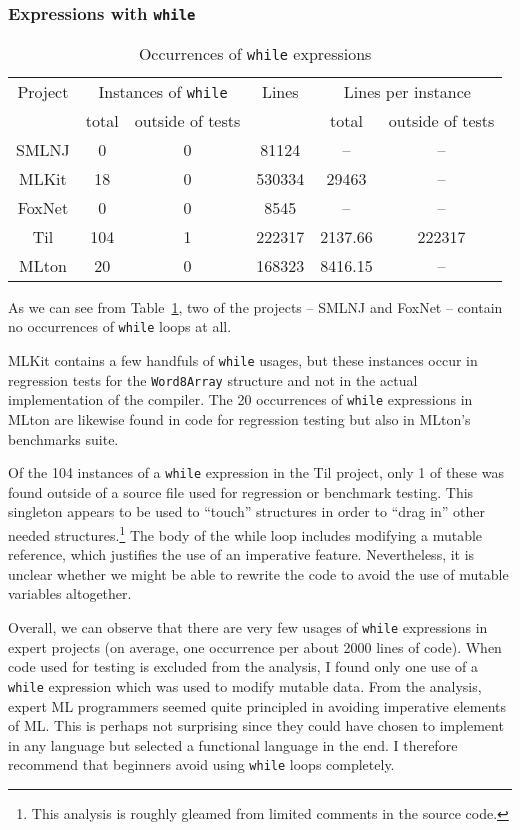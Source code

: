 \documentclass[12pt,abstracton]{scrartcl}
\begin{document}
\subsubsection{Expressions with \texttt{while}}
\begin{table}[h!]
\centering
\begin{tabular}{|c||c|c||c|c|c|}
\hline
Project & \multicolumn{2}{c||}{Instances of \texttt{while}} & Lines & \multicolumn{2}{c|}{Lines per instance} \\ \cline{2-3}\cline{5-6}
 & total & outside of tests &  & total & outside of tests \\ \hline\hline
SMLNJ & 0 & 0 & 81124 & -- & --\\ 
MLKit & 18 & 0 & 530334 & 29463 & --\\
FoxNet & 0 & 0 & 8545 & -- & -- \\
Til & 104 & 1 & 222317 & 2137.66 & 222317 \\
MLton & 20 & 0 & 168323 & 8416.15 & --\\ \hline
\end{tabular}
\caption{Occurrences of \texttt{while} expressions}
\label{table:while}
\end{table}
As we can see from Table~\ref{table:while}, two of the projects -- SMLNJ and FoxNet -- contain no occurrences
of \texttt{while} loops at all.

MLKit contains a few handfuls of \texttt{while} usages, but these instances
occur in regression tests for the \texttt{Word8Array} structure and not in the actual implementation of the compiler.
The 20 occurrences of \texttt{while} expressions in MLton are likewise found in code for regression testing but
also in MLton's benchmarks suite.

Of the 104 instances of a \texttt{while} expression in the Til project,
only 1 of these was found outside of a source file used for regression or benchmark testing.
This singleton appears to be used to ``touch''
structures in order to ``drag in'' other needed structures.\footnote{This analysis is roughly gleamed from limited comments in the source code.}
The body of the while loop includes modifying a mutable reference, which justifies the use of
an imperative feature. Nevertheless, it is unclear whether we might be able to rewrite the code
to avoid the use of mutable variables altogether.

Overall, we can observe that there are very few usages of \texttt{while} expressions
in expert projects (on average, one occurrence per about 2000 lines of code).
When code used for testing is excluded from the analysis, I found only one use
of a \texttt{while} expression which was used to modify mutable data.
From the analysis, expert ML programmers seemed quite principled in avoiding imperative
elements of ML. This is perhaps not surprising since they could have chosen
to implement in any language but selected a functional language in the end.
I therefore recommend that beginners avoid using \texttt{while} loops completely.
\end{document}
